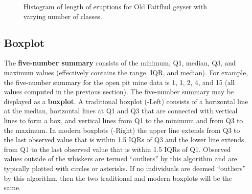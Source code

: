 \documentclass[10pt,openany]{book}\usepackage[]{graphicx}\usepackage[]{color}
\newenvironment{knitrout}{}{} %
\begin{document}
\begin{knitrout}
\color{fgcolor}


















































\begin{figure}[hbtp]

{\centering {}

}

\caption[Histogram of length of eruptions for Old Faitfhul geyser with varying number of classes]{Histogram of length of eruptions for Old Faitfhul geyser with varying number of classes.}\label{fig:histOF}
\end{figure}


\end{knitrout}


\subsection{Boxplot}
The \textbf{five-number summary} consists of the minimum, Q1, median, Q3, and maximum values (effectively contains the range, IQR, and median). For example, the five-number summary for the open pit mine data is 1, 1, 2, 4, and 15 (all values computed in the previous section). The five-number summary may be displayed as a \textbf{boxplot}. A traditional boxplot (-Left) consists of a horizontal line at the median, horizontal lines at Q1 and Q3 that are connected with vertical lines to form a box, and vertical lines from Q1 to the minimum and from Q3 to the maximum. In modern boxplots (-Right) the upper line extends from Q3 to the last observed value that is within 1.5 IQRs of Q3 and the lower line extends from Q1 to the last observed value that is within 1.5 IQRs of Q1. Observed values outside of the whiskers are termed ``outliers'' by this algorithm and are typically plotted with circles or asterisks. If no individuals are deemed ``outliers'' by this algorithm, then the two traditional and modern boxplots will be the same.
\end{document}
